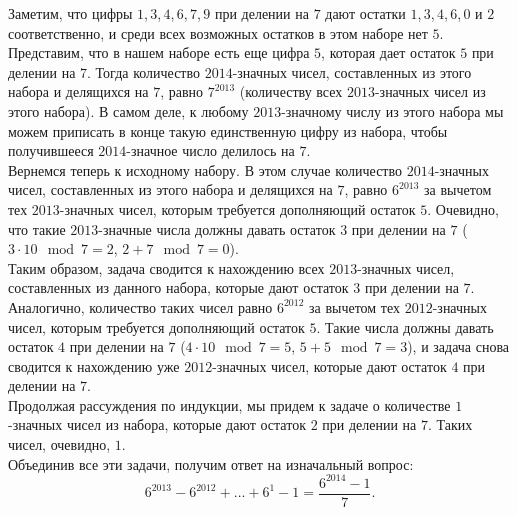 \documentclass{article}
\begin{document}
Заметим, что цифры $1$,$\,3$,$\,4$,$\,6$,$\,7$,$\,9$ при делении на $7$ дают остатки $1$,$\,3$,$\,4$,$\,6$,$\,0$ и $2$ соответственно, и среди всех возможных остатков в 
этом наборе нет $5$. Представим, что в нашем наборе есть еще цифра $5$, которая дает остаток $5$ при делении на $7$. Тогда количество $2014$-значных чисел, составленных из этого 
набора и делящихся на $7$, равно $7^{2013}$ (количеству всех $2013$-значных чисел из этого набора). В самом деле, к любому $2013$-значному числу из этого набора мы можем приписать в конце 
такую единственную цифру из набора, чтобы получившееся $2014$-значное число делилось на $7$.\\
Вернемся теперь к исходному набору. В этом случае количество $2014$-значных чисел, составленных из этого набора и делящихся на $7$, равно $6^{2013}$ за вычетом тех $2013$-значных чисел, 
которым требуется дополняющий остаток $5$. Очевидно, что такие $2013$-значные числа должны давать остаток $3$ при делении на $7$ ($3\cdot 10 \mod 7 = 2$, $2+7 \mod 7 = 0$).\\
Таким образом, задача сводится к нахождению всех $2013$-значных чисел, составленных из данного набора, которые дают остаток $3$ при делении на $7$. Аналогично, количество таких чисел 
равно $6^{2012}$ за вычетом тех $2012$-значных чисел, которым требуется дополняющий остаток $5$. Такие числа должны давать остаток $4$ при делении на $7$ ($4\cdot 10 \mod 7 =5$, $5+5 \mod 7 = 3$), и 
задача снова сводится к нахождению уже $2012$-значных чисел, которые дают остаток $4$ при делении на $7$.\\
Продолжая рассуждения по индукции, мы придем к задаче о количестве $1$-значных чисел из набора, которые дают остаток $2$ при делении на $7$. Таких чисел, очевидно, $1$.\\
Объединив все эти задачи, получим ответ на изначальный вопрос:
$$6^{2013} - 6^{2012} + \ldots + 6^1 - 1 = \frac{6^{2014}-1}{7}.$$
\end{document}

